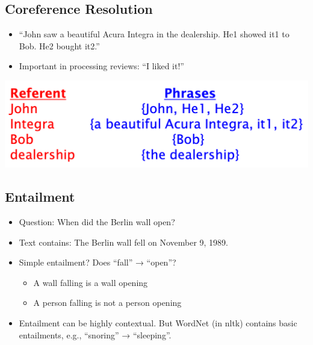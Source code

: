 \documentclass[11pt]{article}
\theoremstyle{definition}
\begin{document}
\subsection{Coreference Resolution}
\begin{itemize}
  \item “John saw a beautiful Acura Integra in the dealership.
  He1 showed it1 to Bob.
  He2 bought it2.”
  \item Important in processing reviews: “I liked it!”
\end{itemize}
\includegraphics[width=\textwidth/2]{4.png}

\subsection{Entailment}
\begin{itemize}
  \item Question: When did the Berlin wall open?
  \item Text contains: The Berlin wall fell on November 9, 1989.
  \item Simple entailment? Does “fall” → “open”?
  \begin{itemize}
    \item A wall falling is a wall opening
    \item A person falling is not a person opening
  \end{itemize}
  \item Entailment can be highly contextual. But WordNet (in nltk)
  contains basic entailments, e.g., “snoring” → “sleeping”.
\end{itemize}
\end{document}
